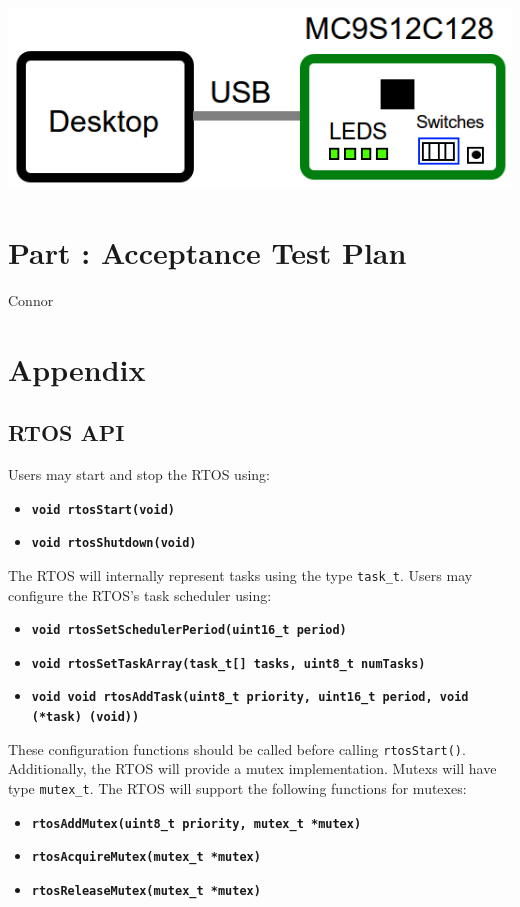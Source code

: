 \documentclass{article}
\newcounter{partNum}
\newcommand{\partNum}{%
        \stepcounter{partNum}%
        \thepartNum}
\newcommand{\sectPart}[1]{\section*{Part \partNum: #1}}
\newcommand{\bitem}[1]{\item \textbf{#1}}
\begin{document}
\begin{center}
    \includegraphics[scale=0.5]{hardware.png}
\end{center}


\sectPart{Acceptance Test Plan}

Connor


\section*{Appendix}

	\subsection*{RTOS API}
		
        Users may start and stop the RTOS using:
        \begin{itemize}
            \bitem{\texttt{void rtosStart(void)}}
            \bitem{\texttt{void rtosShutdown(void)}}
        \end{itemize}

        The RTOS will internally represent tasks using the type \texttt{task\_t}. Users may configure the RTOS's task scheduler using:
        \begin{itemize}
            \bitem{\texttt{void rtosSetSchedulerPeriod(uint16\_t period)}}
            \bitem{\texttt{void rtosSetTaskArray(task\_t[] tasks, uint8\_t numTasks)}}
            \bitem{\texttt{void void rtosAddTask(uint8\_t priority, uint16\_t period, void (*task) (void))}}
        \end{itemize}
        These configuration functions should be called before calling \texttt{rtosStart()}. \\


        Additionally, the RTOS will provide a mutex implementation. Mutexs will have type \texttt{mutex\_t}. The RTOS will support the following functions for mutexes:
        \begin{itemize}
            \bitem{\texttt{rtosAddMutex(uint8\_t priority, mutex\_t *mutex)}}
            \bitem{\texttt{rtosAcquireMutex(mutex\_t *mutex)}}
            \bitem{\texttt{rtosReleaseMutex(mutex\_t *mutex)}}
        \end{itemize}
\end{document}
